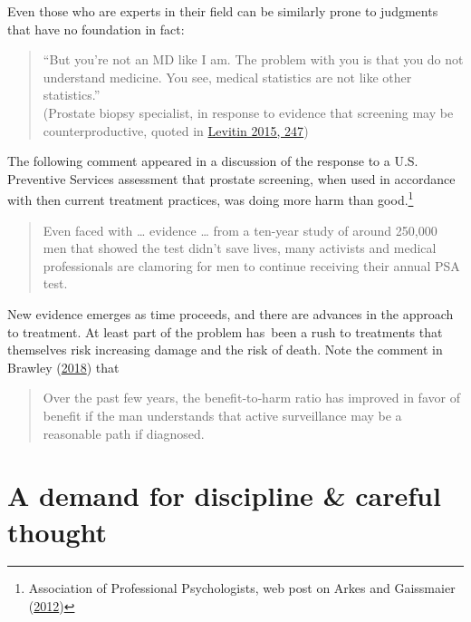 \documentclass[
  10pt,
  b5paper]{book}
\begin{document}
Even those who are experts in their field can be similarly prone to judgments that have no foundation in fact:

\begin{quote}
``But you're not an MD like I am. The problem with you is that you do not understand medicine. You see, medical statistics are not like other statistics.''\\
(Prostate biopsy specialist, in response to evidence that screening may be counterproductive, quoted in \protect\hyperlink{ref-levitin_2015}{Levitin 2015, 247})
\end{quote}

The following comment appeared in a discussion of the response to a U.S. Preventive Services assessment that prostate screening, when used in accordance with then current treatment practices, was doing more harm than good.\footnote{Association of Professional Psychologists, web post on Arkes and Gaissmaier (\protect\hyperlink{ref-arkes2012psychological}{2012})}

\begin{quote}
Even faced with \ldots{} evidence \ldots{} from a ten-year study of around 250,000
men that showed the test didn't save lives, many activists and medical professionals are clamoring for men to continue receiving their annual PSA test.
\end{quote}

New evidence emerges as time proceeds, and there are advances in the approach to treatment. At least part of the problem has~been a rush to treatments that themselves risk increasing damage and the risk of death. Note the comment in Brawley (\protect\hyperlink{ref-brawley2018prostate}{2018}) that

\begin{quote}
Over the past few years, the benefit‐to‐harm ratio has improved in favor of benefit if the man understands that active surveillance may be a reasonable path if diagnosed.
\end{quote}

\hypertarget{a-demand-for-discipline-careful-thought}{%
\section{A demand for discipline \& careful thought}\label{a-demand-for-discipline-careful-thought}}
\end{document}
